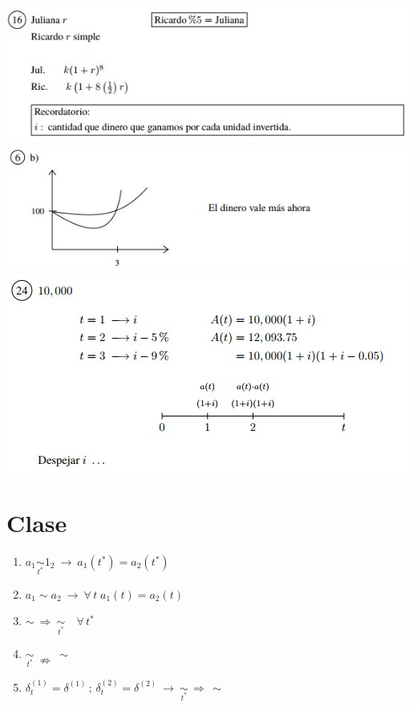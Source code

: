 \documentclass[
]{book}
\theoremstyle{definition}
\theoremstyle{definition}
\theoremstyle{definition}
\theoremstyle{definition}
\theoremstyle{remark}
\begin{document}
\includegraphics{images/11.jpg}
\includegraphics{images/12.jpg}
\includegraphics{images/13.jpg}

\hypertarget{clase-1}{%
\section{Clase}\label{clase-1}}

\begin{enumerate}
\def\labelenumi{\arabic{enumi}.}
\item
  \(a_1 \underset{t^{*}}{\sim} 1_2 \: \longrightarrow \: a_1(t^{*}) = a_2(t^{*})\)
\item
  \(a_1 \sim a_2 \: \longrightarrow \: \forall \, t \; a_1(t) = a_2(t)\)
\item
  \(\sim \: \Longrightarrow \: \underset{t^{*}}{\sim} \quad \forall\, t^{*}\)
\item
  \(\underset{t^{*}}{\sim} \: \nRightarrow \: \sim\)
\item
  \(\delta_t^{(1)}=\delta^{(1)}\, ; \, \delta_t^{(2)} = \delta^{(2)} \: \longrightarrow \: \underset{t^{*}}{\sim} \, \Longrightarrow \, \sim\)
\end{enumerate}
\end{document}
